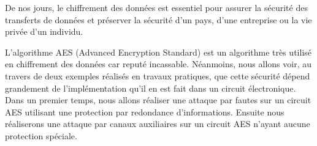 De nos jours, le chiffrement des données est essentiel pour assurer la sécurité
des transferts de données et préserver la sécurité d'un pays, d'une entreprise
ou la vie privée d'un individu. 

L'algorithme AES (Advanced Encryption Standard) est un algorithme très utilisé
en chiffrement des données car reputé incassable. Néanmoins, nous allons voir,
au travers de deux exemples réalisés en travaux pratiques, que cette sécurité
dépend grandement de l'implémentation qu'il en est fait dans un circuit 
électronique.\\

Dans un premier temps, nous allons réaliser une attaque par fautes sur un 
circuit AES utilisant une protection par redondance d'informations.
Ensuite nous réaliserons une attaque par canaux auxiliaires sur un circuit
AES n'ayant aucune protection spéciale.
